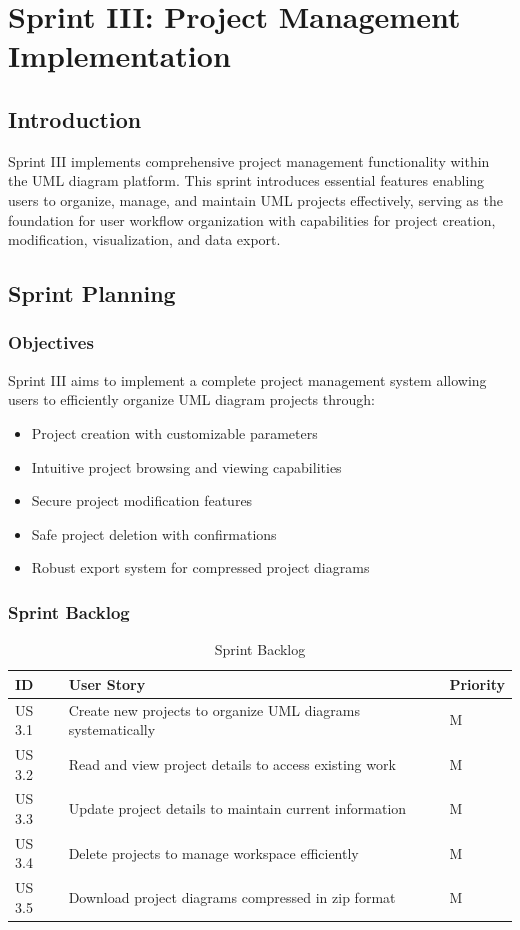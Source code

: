 \chapter[Sprint III]{Sprint III: Project Management Implementation}

\section{Introduction}

Sprint III implements comprehensive project management functionality within the UML diagram platform. This sprint introduces essential features enabling users to organize, manage, and maintain UML projects effectively, serving as the foundation for user workflow organization with capabilities for project creation, modification, visualization, and data export.

\section{Sprint Planning}

\subsection{Objectives}
Sprint III aims to implement a complete project management system allowing users to efficiently organize UML diagram projects through:
\begin{itemize}
    \item Project creation with customizable parameters
    \item Intuitive project browsing and viewing capabilities
    \item Secure project modification features
    \item Safe project deletion with confirmations
    \item Robust export system for compressed project diagrams
\end{itemize}

\subsection{Sprint Backlog}


\begin{table}[H]
\centering
\caption{Sprint Backlog}
\begin{tabular}{|p{1.5cm}|p{8cm}|p{2cm}|}
\hline
\textbf{ID} & \textbf{User Story} & \textbf{Priority} \\
\hline
US 3.1 & Create new projects to organize UML diagrams systematically & M \\
\hline
US 3.2 & Read and view project details to access existing work & M \\
\hline
US 3.3 & Update project details to maintain current information & M \\
\hline
US 3.4 & Delete projects to manage workspace efficiently & M \\
\hline
US 3.5 & Download project diagrams compressed in zip format & M \\
\hline
\end{tabular}
\end{table}


